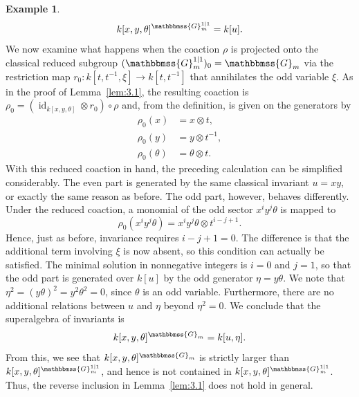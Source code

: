\documentclass[11pt,a4paper,reqno,noamsfonts]{amsart}
\numberwithin{equation}{section}
\theoremstyle{definition}
\newtheorem{example}[theorem]{Example}
\theoremstyle{remark}
\newcommand{\GG}{\ensuremath{\mathbbmss{G}}}
\DeclareMathOperator{\id}{id}
\begin{document}
\begin{example}
$$
k[x,y,\theta]^{\GG_m^{1 \vert 1}} = k[u].
$$
We now examine what happens when the coaction $\rho$ is projected onto the classical reduced subgroup  $(\GG_m^{1 \vert 1})_0 = \GG_m$ via the restriction map $r_0 \colon k[t,t^{-1},\xi] \to k[t,t^{-1}]$ that annihilates the odd variable $\xi$. As in the proof of Lemma~\ref{lem:3.1}, the resulting coaction is $\rho_0 = (\id_{k[x,y,\theta]} \otimes r_0) \circ \rho$ and, from the definition, is given on the generators by
$$
\begin{aligned}
\rho_0(x) &= x \otimes t, \\
\rho_0(y) &= y \otimes t^{-1}, \\
\rho_0(\theta) &= \theta \otimes t .
\end{aligned}
$$
With this reduced coaction in hand, the preceding calculation can be simplified considerably. The even part is generated by the same classical invariant $u = xy$, or exactly the same reason as before. The odd part, however, behaves differently. Under the reduced coaction, a monomial of the odd sector $x^{i} y^{j} \theta$ is mapped to
$$
\rho_0(x^{i}y^{j} \theta) = x^{i} y^{j} \theta \otimes t^{i - j +1}.
$$
Hence, just as before, invariance requires $i-j+1 = 0$. The difference is that the additional term involving $\xi$ is now absent, so this condition can actually be satisfied. The minimal solution in nonnegative integers is $i=0$ and $j=1$, so that the odd part is generated over $k[u]$ by the odd generator $\eta = y\theta$. We note that $\eta^2 = (y\theta)^2 = y^2\theta^2 = 0$, since $\theta$ is an odd variable. Furthermore, there are no additional relations between $u$ and $\eta$ beyond $\eta^2=0$. We conclude that the superalgebra of invariants is
$$
k[x,y,\theta]^{\GG_m} = k[u,\eta].
$$
From this, we see that $k[x,y,\theta]^{\GG_m}$ is strictly larger than $k[x,y,\theta]^{\GG_m^{1 \vert 1}}$, and hence is not contained in $k[x,y,\theta]^{\GG_m^{1 \vert 1}}$. Thus, the reverse inclusion in Lemma~\ref{lem:3.1} does not hold in general.
\end{example}
\end{document}
